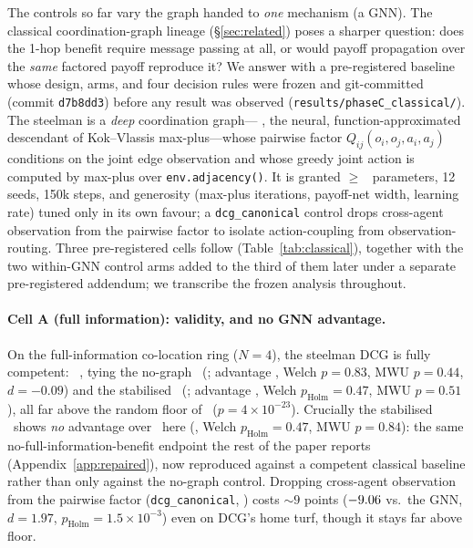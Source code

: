 The controls so far vary the graph handed to \emph{one} mechanism (a GNN). The
classical coordination-graph lineage (\S\ref{sec:related}) poses a sharper
question: does the 1-hop benefit require message passing at all, or would
payoff propagation over the \emph{same} factored payoff reproduce it? We answer
with a pre-registered baseline whose design, arms, and four decision rules were
frozen and git-committed (commit \texttt{d7b8dd3}) before any result was
observed (\texttt{results/phaseC\_classical/}). The steelman is a \emph{deep}
coordination graph--- \citep{boehmer_2020_dcg}, the neural,
function-approximated descendant of Kok--Vlassis max-plus---whose pairwise
factor $Q_{ij}(o_i,o_j,a_i,a_j)$ conditions on the joint edge observation and
whose greedy joint action is computed by max-plus over
\texttt{env.adjacency()}. It is granted $\ge$ \gnnqmix\ parameters, 12 seeds,
150k steps, and generosity (max-plus iterations, payoff-net width, learning
rate) tuned only in its own favour; a \texttt{dcg\_canonical} control drops
cross-agent observation from the pairwise factor to isolate action-coupling
from observation-routing. Three pre-registered cells follow
(Table~\ref{tab:classical}), together with the two within-GNN control arms
added to the third of them later under a separate pre-registered addendum; we
transcribe the frozen analysis throughout.

\paragraph{Cell A (full information): validity, and no GNN advantage.} On the
full-information co-location ring ($N{=}4$), the steelman DCG is fully
competent: \CBAdcg\ \CBAdcgCI, tying the no-graph \mlpqmix\ (\CBAmlp; advantage
\CBAdcgMlpGap, Welch $p{=}0.83$, MWU $p{=}0.44$, $d{=}{-}0.09$) and the
stabilised \gnnqmix\ (\CBAgnn; advantage \CBAgnnDcgGap, Welch
$p_{\text{Holm}}{=}0.47$, MWU $p{=}0.51$), all far above the random floor of
\CBAfloor\ ($p{=}4{\times}10^{-23}$). Crucially the stabilised \gnnqmix\ shows
\emph{no} advantage over \mlpqmix\ here (\CBAgnnMlpGap, Welch
$p_{\text{Holm}}{=}0.47$, MWU $p{=}0.84$): the same no-full-information-benefit
endpoint the rest of the paper reports (Appendix~\ref{app:repaired}), now
reproduced against a competent classical baseline rather than only against the
no-graph control. Dropping cross-agent observation from the pairwise factor
(\texttt{dcg\_canonical}, \CBAcanon) costs ${\sim}9$ points ($-9.06$
vs.\ the GNN, $d{=}1.97$, $p_{\text{Holm}}{=}1.5{\times}10^{-3}$) even on DCG's
home turf, though it stays far above floor.

